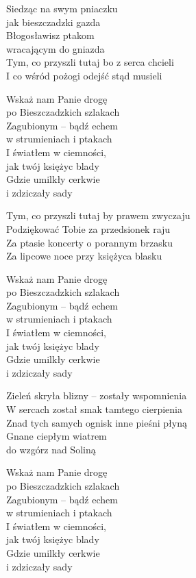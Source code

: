 \begin{text}
\hfill\break
\hfill\break
Siedząc na swym pniaczku\\
jak bieszczadzki gazda\\
Błogosławisz ptakom\\
wracającym do gniazda\\
Tym, co przyszli tutaj bo z serca chcieli\\
I co wśród pożogi odejść stąd musieli

\vin Wskaż nam Panie drogę\\
\vin po Bieszczadzkich szlakach\\
\vin Zagubionym – bądź echem\\
\vin w strumieniach i ptakach\\
\vin I światłem w ciemności,\\
\vin jak twój księżyc blady\\
\vin Gdzie umilkły cerkwie\\
\vin i zdziczały sady

Tym, co przyszli tutaj by prawem zwyczaju\\
Podziękować Tobie za przedsionek raju\\
Za ptasie koncerty o porannym brzasku\\
Za lipcowe noce przy księżyca blasku

\vin Wskaż nam Panie drogę\\
\vin po Bieszczadzkich szlakach\\
\vin Zagubionym – bądź echem\\
\vin w strumieniach i ptakach\\
\vin I światłem w ciemności,\\
\vin jak twój księżyc blady\\
\vin Gdzie umilkły cerkwie\\
\vin i zdziczały sady

\hfill\break
Zieleń skryła blizny – zostały wspomnienia\\
W sercach został smak tamtego cierpienia\\
Znad tych samych ognisk inne pieśni płyną\\
Gnane ciepłym wiatrem\\
do wzgórz nad Soliną

\vin Wskaż nam Panie drogę\\
\vin po Bieszczadzkich szlakach\\
\vin Zagubionym – bądź echem\\
\vin w strumieniach i ptakach\\
\vin I światłem w ciemności,\\
\vin jak twój księżyc blady\\
\vin Gdzie umilkły cerkwie\\
\vin i zdziczały sady
\end{text}
